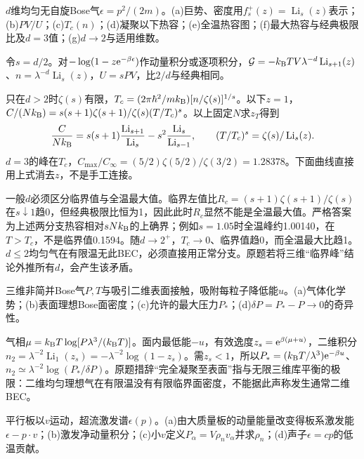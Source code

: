 \begin{exercise}[原题11(a)--(g)，选做]\label{p:333-6-11}
$d$维均匀无自旋Bose气$\epsilon=p^2/(2m)$。(a)巨势、密度用$f_s^+(z)=\operatorname{Li}_s(z)$表示；(b)$PV/U$；(c)$T_c(n)$；(d)凝聚以下热容；(e)全温热容图；(f)最大热容与经典极限比及$d=3$值；(g)$d\to2$与适用维数。
\end{exercise}
\begin{solution}
令$s=d/2$。对$-\log(1-z\mathrm e^{-\beta\epsilon})$作动量积分或逐项积分，$\mathcal G=-k_{\mathrm B} TV\lambda^{-d}\operatorname{Li}_{s+1}(z)$、$n=\lambda^{-d}\operatorname{Li}_s(z)$，$U=sPV$，比$2/d$与经典相同。

只在$d>2$时$\zeta(s)$有限，$T_c=(2\pi\hbar^2/mk_{\mathrm B})[n/\zeta(s)]^{1/s}$。以下$z=1$，$C/(Nk_{\mathrm B})=s(s+1)\zeta(s+1)/\zeta(s)(T/T_c)^s$。以上固定$N$求$z_T$得到
\begin{equation}
\frac C{Nk_{\mathrm B}}=s(s+1)\frac{\operatorname{Li}_{s+1}}{\operatorname{Li}_s}-s^2\frac{\operatorname{Li}_s}{\operatorname{Li}_{s-1}},\qquad
(T/T_c)^s=\zeta(s)/\operatorname{Li}_s(z).
\end{equation}
$d=3$的峰在$T_c$，$C_{\max}/C_\infty=(5/2)\zeta(5/2)/\zeta(3/2)=1.28378$。下面曲线直接用上式消去$z$，不是手工连接。


一般$d$必须区分临界值与全温最大值。临界左值比$R_c=(s+1)\zeta(s+1)/\zeta(s)$在$s\downarrow1$趋0，但经典极限比恒为1，因此此时$R_c$显然不能是全温最大值。严格答案为上述两分支热容相对$sNk_{\mathrm B}$的上确界；例如$s=1.05$时全温峰约1.00140，在$T>T_c$，不是临界值0.1594。随$d\to2^+$，$T_c\to0$、临界值趋0，而全温最大比趋1。$d\le2$均匀气在有限温无此BEC，必须直接用正常分支。原题若将三维“临界峰”结论外推所有$d$，会产生该矛盾。
\end{solution}
\begin{exercise}[原题12(a)--(d)，选做]\label{p:333-6-12}
三维非简并Bose气$P,T$与吸引二维表面接触，吸附每粒子降低能$u$。(a)气体化学势；(b)表面理想Bose面密度；(c)允许的最大压力$P_*$；(d)$\delta P=P_*-P\to0$的奇异性。
\end{exercise}
\begin{solution}
气相$\mu=k_{\mathrm B} T\log[P\lambda^3/(k_{\mathrm B} T)]$。面内最低能$-u$，有效逸度$z_s=\mathrm e^{\beta(\mu+u)}$，二维积分$n_2=\lambda^{-2}\operatorname{Li}_1(z_s)=-\lambda^{-2}\log(1-z_s)$。需$z_s<1$，所以$P_*=(k_{\mathrm B} T/\lambda^3)\mathrm e^{-\beta u}$、$n_2\simeq\lambda^{-2}\log(P_*/\delta P)$。原题措辞“完全凝聚至表面”指与无限三维库平衡的极限：二维均匀理想气在有限温没有有限临界面密度，不能据此声称发生通常二维BEC。
\end{solution}
\begin{exercise}[原题13(a)--(d)，选做]\label{p:333-6-13}
平行板以$v$运动，超流激发谱$\epsilon(p)$。(a)由大质量板的动量能量改变得板系激发能$\epsilon-p\cdot v$；(b)激发净动量积分；(c)小$v$定义$P_\alpha=V\rho_nv_\alpha$并求$\rho_n$；(d)声子$\epsilon=cp$的低温贡献。
\end{exercise}
